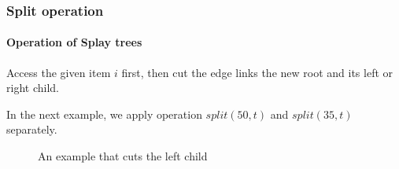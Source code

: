 \documentclass{beamer}
\theoremstyle{plain}
\begin{document}
    \begin{frame}[fragile]
        \frametitle{Split operation}
        \framesubtitle{Operation of Splay trees}
    
        Access the given item $i$ first, then cut the edge links the new root and its left or right child.

        In the next example, we apply operation $split(50, t)$ and $split(35, t)$ separately.

        \begin{figure}
            \centering
            \qquad
            \caption{An example that cuts the left child}
        \end{figure}
    
    \end{frame}
\end{document}
